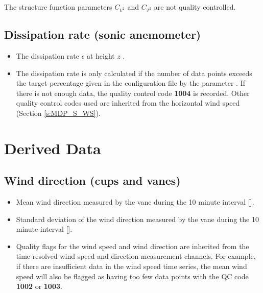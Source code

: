 The structure function parameters $C_{V^2}$ and $C_{T^2}$ are not quality controlled.

\subsection{Dissipation rate (sonic anemometer)}
\begin{itemize}
\item {} The dissipation rate $\epsilon$ at height $z$ .
\item {} The dissipation rate is only calculated if the number of data points exceeds the target percentage given in the configuration file by the parameter . If there is not enough data, the quality control code \textbf{1004} is recorded. Other quality control codes used are inherited from the horizontal wind speed (Section \ref{s:MDP_S_WS}).
\end{itemize}

\section{Derived Data}
\subsection{Wind direction (cups and vanes)}
\begin{itemize}
\item {} Mean wind direction measured by the vane during the 10 minute interval [\degree].
\item {} Standard deviation of the wind direction measured by the vane during the 10 minute interval [\degree].
\item {} Quality flags for the wind speed and wind direction are inherited from the time-resolved wind speed and direction measurement channels. For example, if there are insufficient data in the wind speed time series, the mean wind speed will also be flagged as having too few data points with the QC code \textbf{1002} or \textbf{1003}.
\end{itemize}

